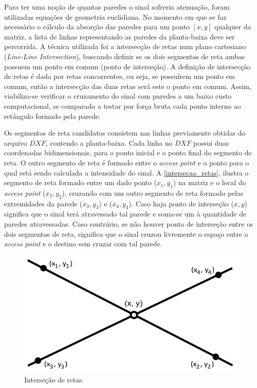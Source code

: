 \documentclass[
	12pt,				%
	twoside,			%
	a4paper,			%
	english,			%
	french,				%
	spanish,			%
	brazil				%
	]{abntex2}
\begin{document}
Para ter uma noção de quantas paredes o sinal sofreria atenuação, foram
utilizadas equações de geometria euclidiana. No momento em que se faz
necessário o cálculo da absorção das paredes para um ponto \([x, y]\)
qualquer da matriz, a lista de linhas representando as paredes da
planta-baixa deve ser percorrida. A técnica utilizada foi a intersecção
de retas num plano cartesiano (\emph{Line-Line Intersection}), buscando
definir se os dois segmentos de reta ambas possuem um ponto em comum
(ponto de interseção). A definição de intersecção de retas é dada por
retas concorrentes, ou seja, se possuírem um ponto em comum, então a
intersecção das duas retas será este o ponto em comum. Assim,
viabiliza-se verificar o cruzamento do sinal com paredes a um baixo
custo computacional, se comparado a testar por força bruta cada ponto
interno ao retângulo formado pela parede.

Os segmentos de reta candidatos consistem nas linhas previamente obtidas
do arquivo \(DXF\), contendo a planta-baixa. Cada linha no \(DXF\)
possui duas coordenadas bidimensionais, para o ponto inicial e o ponto
final do segmento de reta. O outro segmento de reta é formado entre o
\emph{access point} e o ponto para o qual está sendo calculada a
intensidade do sinal. A \autoref{intersecao_retas}, ilustra o segmento
de reta formado entre um dado ponto (\(x_{1}, y_{1}\)) na matriz e o
local do \emph{access point} (\(x_{2}, y_{2}\)), cruzando com um outro
segmento de reta formado pelas extremidades da parede (\(x_{3}, y_{3}\))
e (\(x_{4}, y_{4}\)). Caso haja ponto de interseção (\(x, y\)) significa
que o sinal terá atravessado tal parede e soma-se um à quantidade de
paredes atravessadas. Caso contrário, se não houver ponto de interseção
entre os dois segmentos de reta, significa que o sinal cruzou livremente
o espaço entre o \emph{access point} e o destino sem cruzar com tal
parede.

\begin{figure}[ht]
    \caption{\label{intersecao_retas} Interseção de retas.}
    \begin{center}
        \includegraphics[scale=0.5]{imagens/inter.jpg}
    \end{center}
\end{figure}
\end{document}
